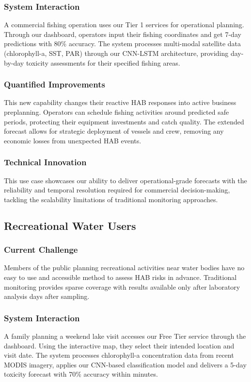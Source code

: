 \documentclass[conference]{IEEEtran}
\begin{document}
\subsubsection{System Interaction}
A commercial fishing operation uses our Tier 1 services for operational planning. Through our dashboard, operators input their fishing coordinates and get 7-day predictions with 80\% accuracy. The system processes multi-modal satellite data (chlorophyll-a, SST, PAR) through our CNN-LSTM architecture, providing day-by-day toxicity assessments for their specified fishing areas.
\subsubsection{Quantified Improvements}
This new capability changes their reactive HAB responses into active business preplanning. Operators can schedule fishing activities around predicted safe periods, protecting their equipment investments and catch quality. The extended forecast allows for strategic deployment of vessels and crew, removing any economic losses from unexpected HAB events.
\subsubsection{Technical Innovation}
This use case showcases our ability to deliver operational-grade forecasts with the reliability and temporal resolution required for commercial decision-making, tackling the scalability limitations of traditional monitoring approaches.

\subsection{Recreational Water Users}
\subsubsection{Current Challenge}
Members of the public planning recreational activities near water bodies have no easy to use and accessible method to assess HAB risks in advance. Traditional monitoring provides sparse coverage with results available only after laboratory analysis days after sampling.
\subsubsection{System Interaction}
A family planning a weekend lake visit accesses our Free Tier service through the dashboard. Using the interactive map, they select their intended location and visit date. The system processes chlorophyll-a concentration data from recent MODIS imagery, applies our CNN-based classification model and delivers a 5-day toxicity forecast with 70\% accuracy within minutes.
\end{document}
